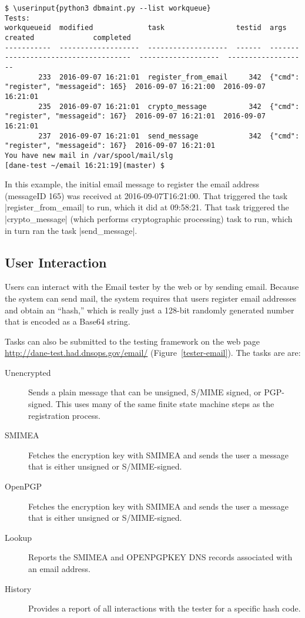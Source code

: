 \documentclass[preprint,3p,11pt]{elsarticle}
\newcommand\userinput[1]{\textbf{#1}}
\begin{document}
\begin{Verbatim}[commandchars=\\\{\},fontsize=\tiny]
$ \userinput{python3 dbmaint.py --list workqueue}
Tests:
workqueueid  modified             task                 testid  args                                   created              completed
-----------  -------------------  -------------------  ------  -------------------------------------  -------------------  -------------------
        233  2016-09-07 16:21:01  register_from_email     342  {"cmd": "register", "messageid": 165}  2016-09-07 16:21:00  2016-09-07 16:21:01
        235  2016-09-07 16:21:01  crypto_message          342  {"cmd": "register", "messageid": 167}  2016-09-07 16:21:01  2016-09-07 16:21:01
        237  2016-09-07 16:21:01  send_message            342  {"cmd": "register", "messageid": 167}  2016-09-07 16:21:01
You have new mail in /var/spool/mail/slg
[dane-test ~/email 16:21:19](master) $
\end{Verbatim}

In this example, the initial email message to register the email
address (messageID 165) was received at 2016-09-07T16:21:00. That
triggered the task |register_from_email| to run, which it did at
09:58:21. That task triggered the |crypto_message| (which performs
cryptographic processing) task to run, which in turn ran the task
|send_message|. 

\subsection{User Interaction}
Users can interact with the Email tester by the web or by sending
email. Because the system can send mail, the system requires that
users register email addresses and obtain an ``hash,'' which is
really just a 128-bit randomly generated number that is encoded as a
Base64 string.

Tasks can also be submitted to the testing framework on the web page
\url{http://dane-test.had.dnsops.gov/email/}
(Figure~\ref{tester-email}). The tasks are are:

\begin{description}
\item[Unencrypted] Sends a plain message that can be unsigned, S/MIME
  signed, or PGP-signed. This uses many of the same finite state
  machine steps as the registration process. 
\item[SMIMEA] Fetches the encryption key with SMIMEA and sends the
  user a message that is either unsigned or S/MIME-signed.
\item[OpenPGP] Fetches the encryption key with SMIMEA and sends the
  user a message that is either unsigned or S/MIME-signed.
\item[Lookup] Reports the SMIMEA and OPENPGPKEY DNS records associated
  with an email address.
\item[History] Provides a report of all interactions with the tester
  for a specific hash code.
\end{description}
\end{document}
